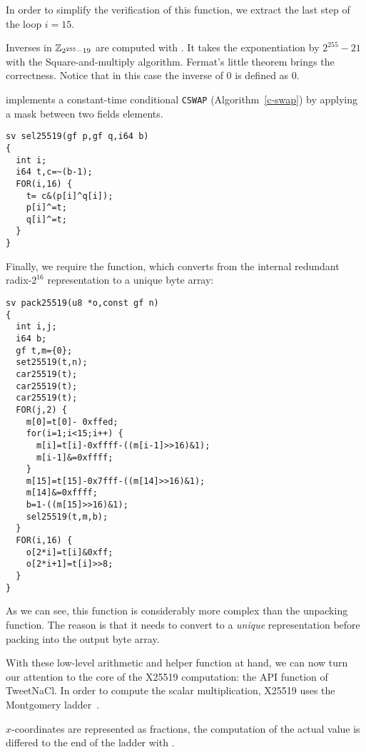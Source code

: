 In order to simplify the verification of this function,
we extract the last step of the loop $i = 15$.

Inverses in $\mathbb{Z}_{2^{255}-19}$ are computed with .
It takes the exponentiation by $2^{255}-21$ with the Square-and-multiply algorithm.
Fermat's little theorem brings the correctness.
Notice that in this case the inverse of $0$ is defined as $0$.

 implements a constant-time conditional \texttt{CSWAP} (Algorithm~\ref{c-swap})
by applying a mask between two fields elements.
\begin{lstlisting}[language=Ctweetnacl]
sv sel25519(gf p,gf q,i64 b)
{
  int i;
  i64 t,c=~(b-1);
  FOR(i,16) {
    t= c&(p[i]^q[i]);
    p[i]^=t;
    q[i]^=t;
  }
}
\end{lstlisting}

Finally, we require the  function,
which converts from the internal redundant radix-$2^{16}$
representation to a unique byte array:
\begin{lstlisting}[language=Ctweetnacl]
sv pack25519(u8 *o,const gf n)
{
  int i,j;
  i64 b;
  gf t,m={0};
  set25519(t,n);
  car25519(t);
  car25519(t);
  car25519(t);
  FOR(j,2) {
    m[0]=t[0]- 0xffed;
    for(i=1;i<15;i++) {
      m[i]=t[i]-0xffff-((m[i-1]>>16)&1);
      m[i-1]&=0xffff;
    }
    m[15]=t[15]-0x7fff-((m[14]>>16)&1);
    m[14]&=0xffff;
    b=1-((m[15]>>16)&1);
    sel25519(t,m,b);
  }
  FOR(i,16) {
    o[2*i]=t[i]&0xff;
    o[2*i+1]=t[i]>>8;
  }
}
\end{lstlisting}

As we can see, this function is considerably more complex than the
unpacking function. The reason is that it needs to convert
to a \emph{unique} representation before packing into the output
byte array.

With these low-level arithmetic and helper function at hand, we can now
turn our attention to the core of the X25519 computation:
the  API function of TweetNaCl.
In order to compute the scalar multiplication,
X25519 uses the Montgomery ladder~\cite{Mon85}.

$x$-coordinates are represented as fractions, the computation of the actual
value is differed to the end of the ladder with .

